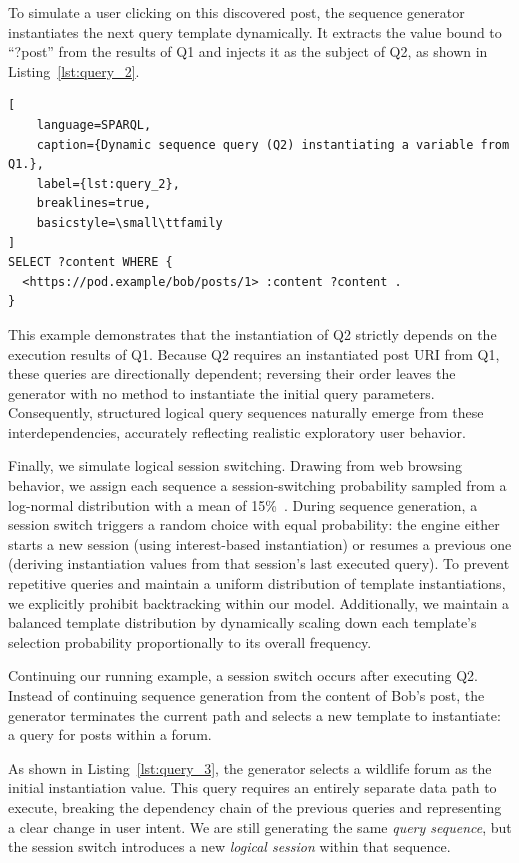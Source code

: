 To simulate a user clicking on this discovered post, the sequence 
generator instantiates the next query template dynamically. It extracts 
the value bound to ``?post'' from the results of Q1 and injects it as the 
subject of Q2, as shown in Listing~\ref{lst:query_2}.

\begin{lstlisting}[
    language=SPARQL,
    caption={Dynamic sequence query (Q2) instantiating a variable from Q1.},
    label={lst:query_2},
    breaklines=true,
    basicstyle=\small\ttfamily
]
SELECT ?content WHERE {
  <https://pod.example/bob/posts/1> :content ?content .
}
\end{lstlisting}

This example demonstrates that the instantiation of Q2 strictly depends 
on the execution results of Q1. Because Q2 requires an instantiated 
post URI from Q1, these queries are directionally dependent; reversing 
their order leaves the generator with no method to instantiate the 
initial query parameters. Consequently, structured logical query sequences 
naturally emerge from these interdependencies, accurately reflecting 
realistic exploratory user behavior.

Finally, we simulate logical session switching. 
Drawing from web browsing behavior, we assign each sequence a session-switching probability sampled from a log-normal 
distribution with a mean of 15\%~\cite{meiss_whats_2009,schneider2009understanding}. 
During sequence generation, a session switch triggers a random choice with equal probability: the engine either starts a new 
session (using interest-based instantiation) or resumes a previous one (deriving instantiation values from that session's last executed query).
To prevent repetitive queries and maintain a uniform distribution of template instantiations, 
we explicitly prohibit backtracking within our model. 
Additionally, we maintain a balanced template distribution by dynamically 
scaling down each template's selection probability proportionally to its 
overall frequency.

Continuing our running example, a session switch occurs after executing Q2. 
Instead of continuing sequence generation from the content of Bob's post, 
the generator terminates the current path and selects a new template to 
instantiate: a query for posts within a forum.

As shown in Listing~\ref{lst:query_3}, the generator selects a wildlife forum 
as the initial instantiation value. This query requires an entirely separate 
data path to execute, breaking the dependency chain of the previous queries 
and representing a clear change in user intent. We are still generating the same
\textit{query sequence}, but the session switch introduces a new \textit{logical session} within that sequence.

